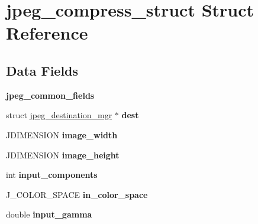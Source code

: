 \hypertarget{structjpeg__compress__struct}{}\section{jpeg\+\_\+compress\+\_\+struct Struct Reference}
\label{structjpeg__compress__struct}
\subsection*{Data Fields}
\begin{DoxyCompactItemize}
\item 
\mbox{\label{structjpeg__compress__struct_a9be75f402698aedbde0c0e499328af59}} 
{\bfseries jpeg\+\_\+common\+\_\+fields}
\item 
\mbox{\label{structjpeg__compress__struct_a7263409bda17e08b29646761f86e8f95}} 
struct \hyperlink{structjpeg__destination__mgr}{jpeg\+\_\+destination\+\_\+mgr} $\ast$ {\bfseries dest}
\item 
\mbox{\label{structjpeg__compress__struct_abb4a6d3633e5b412d8da7030e62362d1}} 
J\+D\+I\+M\+E\+N\+S\+I\+ON {\bfseries image\+\_\+width}
\item 
\mbox{\label{structjpeg__compress__struct_a24f6e6fcab5d2e9fc0228419c181a657}} 
J\+D\+I\+M\+E\+N\+S\+I\+ON {\bfseries image\+\_\+height}
\item 
\mbox{\label{structjpeg__compress__struct_a11755bb1e093ae18b204f7297f73aaf2}} 
int {\bfseries input\+\_\+components}
\item 
\mbox{\label{structjpeg__compress__struct_a938889d8d0b607f09dc1e443ecc1d5c4}} 
J\+\_\+\+C\+O\+L\+O\+R\+\_\+\+S\+P\+A\+CE {\bfseries in\+\_\+color\+\_\+space}
\item 
\mbox{\label{structjpeg__compress__struct_a21b7d5e4d7ebf4e5f95f213aecd78698}} 
double {\bfseries input\+\_\+gamma}
\item 
\mbox{\label{structjpeg__compress__struct_a584f789ebc86969b0543a898d996ac64}} 

\end{DoxyCompactItemize}
